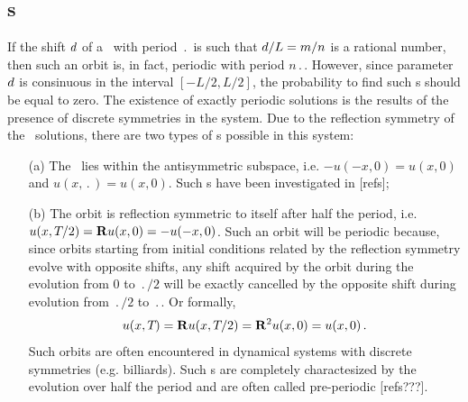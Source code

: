 \subsection{\Po s}
If the shift $d$ of a \rpo\ with period $\period{}$ is such 
that $d /L = m/n$ is a rational number, then such an orbit is, in
fact, periodic with period $n\period{}$.  However, since parameter 
$d$ is consinuous in the interval $[-L/2, L/2]$,
the probability to find such \po s should be equal to zero.  
The existence of exactly periodic solutions is the results of 
the presence of discrete symmetries in the system.  
Due to the reflection symmetry of the \KS\ solutions, there are 
two types of \po s possible in this system:
\begin{itemize}
\item[(a)] The \po\ lies within the antisymmetric subspace, i.e. 
$-u(-x,0) = u(x,0)$ and $u(x,\period{}) = u(x,0)$.  Such \po s have
been investigated in [refs];
\item[(b)] The orbit is reflection symmetric to itself after half
the period, i.e. $u(x,{T_{}}/2) = {\bf R} u(x,0) = -u(-x,0)$.
Such an orbit will be periodic because, since orbits starting from 
initial conditions related by the reflection symmetry evolve with 
opposite shifts, any shift acquired by the orbit during the evolution 
from $0$ to $\period{}/2$ will be exactly cancelled by the opposite 
shift during evolution from $\period{}/2$ to $\period{}$.  Or formally,
\[ u(x,{T_{}}) = {\bf R} u(x,{T_{}}/2) = 
   {\bf R}^2 u(x,0) = u(x,0)\,. \] 
Such orbits are often encountered in dynamical systems with discrete 
symmetries (e.g. billiards).  Such \po s are completely charactesized 
by the evolution over half the period and are often called 
pre-periodic [refs???].
\end{itemize}
